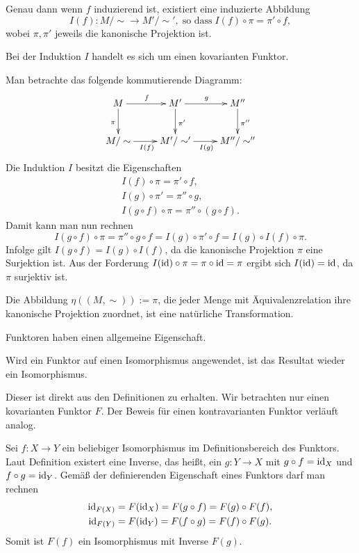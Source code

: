 Genau dann wenn $f$ induzierend ist, existiert eine induzierte
Abbildung
\[I(f)\colon M/\sim\to M'/\sim',\;\text{so dass}\;I(f)\circ\pi = \pi'\circ f,\]
wobei $\pi,\pi'$ jeweils die kanonische Projektion ist.
\begin{Satz}
Bei der Induktion $I$ handelt es sich um einen kovarianten Funktor.
\end{Satz}
 Man betrachte das folgende kommutierende Diagramm:
\[\xymatrix{
M \ar[r]^{f} \ar[d]_{\pi}
& M' \ar[r]^{g} \ar[d]^{\pi'}
& M'' \ar[d]^{\pi''}\\
M/\sim \ar[r]_{I(f)}
& M'/\sim' \ar[r]_{I(g)}
& M''/\sim''}\]
Die Induktion $I$ besitzt die Eigenschaften
\begin{gather*}
I(f)\circ\pi = \pi'\circ f,\\
I(g)\circ\pi' = \pi''\circ g,\\
I(g\circ f)\circ\pi = \pi''\circ (g\circ f).
\end{gather*}
Damit kann man nun rechnen
\begin{equation}
I(g\circ f)\circ\pi = \pi''\circ g\circ f
= I(g)\circ\pi'\circ f = I(g)\circ I(f)\circ\pi.
\end{equation}
Infolge gilt $I(g\circ f)=I(g)\circ I(f)$, da die kanonische
Projektion $\pi$ eine Surjektion ist. Aus der Forderung $I(\operatorname{id})\circ\pi
= \pi\circ\operatorname{id} = \pi$ ergibt sich $I(\operatorname{id}) = \operatorname{id}$,
da $\pi$ surjektiv ist.\;\qedsymbol

Die Abbildung $\eta((M,\sim)):=\pi$, die jeder Menge mit
Äquivalenzrelation ihre kanonische Projektion zuordnet,
ist eine natürliche Transformation.

Funktoren haben einen allgemeine Eigenschaft.
\begin{Satz}
Wird ein Funktor auf einen Isomorphismus angewendet, ist das Resultat
wieder ein Isomorphismus.
\end{Satz}
 Dieser ist direkt aus den Definitionen zu erhalten.
Wir betrachten nur einen kovarianten Funktor $F$. Der Beweis für
einen kontravarianten Funktor verläuft analog.

Sei $f\colon X\to Y$ ein beliebiger Isomorphismus im Definitionsbereich
des Funktors. Laut Definition existert eine Inverse, das heißt, ein
$g\colon Y\to X$ mit $g\circ f = \operatorname{id}_X$ und $f\circ g = \operatorname{id}_Y$. Gemäß
der definierenden Eigenschaft eines Funktors darf man rechnen
\begin{gather*}
\operatorname{id}_{F(X)} = F(\operatorname{id}_X) = F(g\circ f) = F(g)\circ F(f),\\
\operatorname{id}_{F(Y)} = F(\operatorname{id}_Y) = F(f\circ g) = F(f)\circ F(g).
\end{gather*}
Somit ist $F(f)$ ein Isomorphismus mit Inverse $F(g)$.\,\qedsymbol

